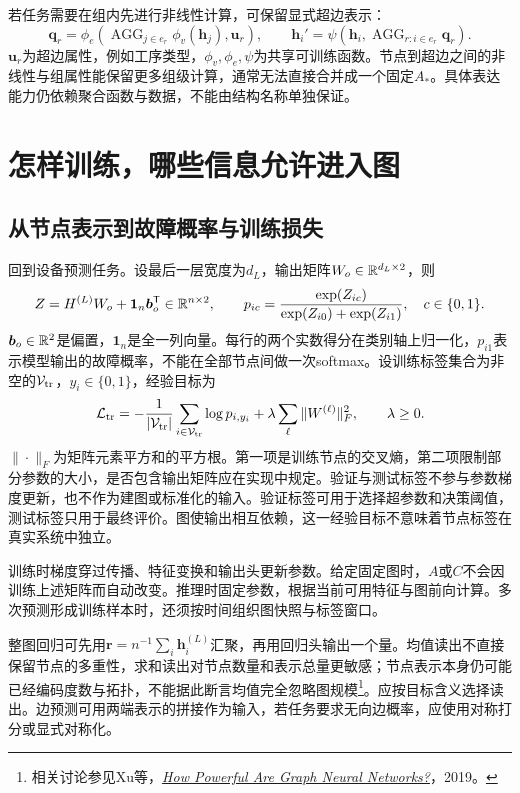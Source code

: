 若任务需要在组内先进行非线性计算，可保留显式超边表示：
\begin{equation}
 \bm q_r=\phi_e\!\left(\operatorname{AGG}_{j\in e_r}\phi_v(\bm h_j),\bm u_r\right),\qquad
 \bm h_i'=\psi\!\left(\bm h_i,\operatorname{AGG}_{r:i\in e_r}\bm q_r\right).
\end{equation}
$\bm u_r$为超边属性，例如工序类型，$\phi_v,\phi_e,\psi$为共享可训练函数。节点到超边之间的非线性与组属性能保留更多组级计算，通常无法直接合并成一个固定$A_*$。具体表达能力仍依赖聚合函数与数据，不能由结构名称单独保证。

\section{怎样训练，哪些信息允许进入图}
\subsection{从节点表示到故障概率与训练损失}
回到设备预测任务。设最后一层宽度为$d_L$，输出矩阵$W_o\in\mathbb{R}^{d_L\times2}$，则
\begin{equation}
 Z=H^{(L)}W_o+\bm1_n\bm b_o^{\mathsf T}\in\mathbb{R}^{n\times2},\qquad
 p_{ic}=\frac{\exp(Z_{ic})}{\exp(Z_{i0})+\exp(Z_{i1})},\quad c\in\{0,1\}.
\end{equation}
$\bm b_o\in\mathbb{R}^2$是偏置，$\bm1_n$是全一列向量。每行的两个实数得分在类别轴上归一化，$p_{i1}$表示模型输出的故障概率，不能在全部节点间做一次softmax。设训练标签集合为非空的$\mathcal V_{\rm tr}$，$y_i\in\{0,1\}$，经验目标为
\begin{equation}
 \mathcal L_{\rm tr}=-\frac1{|\mathcal V_{\rm tr}|}\sum_{i\in\mathcal V_{\rm tr}}\log p_{i,y_i}
 +\lambda\sum_\ell\|W^{(\ell)}\|_F^2,\qquad\lambda\geq0.
\end{equation}
$\|\cdot\|_F$为矩阵元素平方和的平方根。第一项是训练节点的交叉熵，第二项限制部分参数的大小，是否包含输出矩阵应在实现中规定。验证与测试标签不参与参数梯度更新，也不作为建图或标准化的输入。验证标签可用于选择超参数和决策阈值，测试标签只用于最终评价。图使输出相互依赖，这一经验目标不意味着节点标签在真实系统中独立。

训练时梯度穿过传播、特征变换和输出头更新参数。给定固定图时，$A$或$C$不会因训练上述矩阵而自动改变。推理时固定参数，根据当前可用特征与图前向计算。多次预测形成训练样本时，还须按时间组织图快照与标签窗口。

整图回归可先用$\bm r=n^{-1}\sum_i\bm h_i^{(L)}$汇聚，再用回归头输出一个量。均值读出不直接保留节点的多重性，求和读出对节点数量和表示总量更敏感；节点表示本身仍可能已经编码度数与拓扑，不能据此断言均值完全忽略图规模\footnote{相关讨论参见Xu等，\href{https://arxiv.org/abs/1810.00826}{\textit{How Powerful Are Graph Neural Networks?}}，2019。}。应按目标含义选择读出。边预测可用两端表示的拼接作为输入，若任务要求无向边概率，应使用对称打分或显式对称化。

